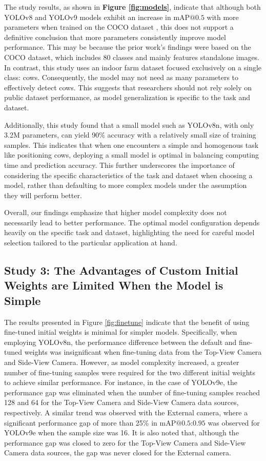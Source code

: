 The study results, as shown in \textbf{Figure \ref{fig:models}}, indicate that although both YOLOv8 \cite{ultralyticsYOLOv8} and YOLOv9 \cite{wang2024yolov9} models exhibit an increase in $\text{mAP@{0.5}}$ with more parameters when trained on the COCO dataset \cite{lin2014microsoft}, this does not support a definitive conclusion that more parameters consistently improve model performance. This may be because the prior work's findings were based on the COCO dataset, which includes 80 classes and mainly features standalone images. In contrast, this study uses an indoor farm dataset focused exclusively on a single class: cows. Consequently, the model may not need as many parameters to effectively detect cows. This suggests that researchers should not rely solely on public dataset performance, as model generalization is specific to the task and dataset.

Additionally, this study found that a small model such as YOLOv8n, with only 3.2M parameters, can yield 90\% accuracy with a relatively small size of training samples. This indicates that when one encounters a simple and homogenous task like positioning cows, deploying a small model is optimal in balancing computing time and prediction accuracy. This further underscores the importance of considering the specific characteristics of the task and dataset when choosing a model, rather than defaulting to more complex models under the assumption they will perform better.

Overall, our findings emphasize that higher model complexity does not necessarily lead to better performance. The optimal model configuration depends heavily on the specific task and dataset, highlighting the need for careful model selection tailored to the particular application at hand.


\subsection{Study 3:  The Advantages of Custom Initial Weights are Limited When the Model is Simple}
The results presented in Figure \ref{fig:finetune} indicate that the benefit of using fine-tuned initial weights is minimal for simpler models. Specifically, when employing YOLOv8n, the performance difference between the default and fine-tuned weights was insignificant when fine-tuning data from the Top-View Camera and Side-View Camera. However, as model complexity increased, a greater number of fine-tuning samples were required for the two different initial weights to achieve similar performance. For instance, in the case of YOLOv9e, the performance gap was eliminated when the number of fine-tuning samples reached 128 and 64 for the Top-View Camera and Side-View Camera data sources, respectively. A similar trend was observed with the External camera, where a significant performance gap of more than 25\% in $\text{mAP@{0.5:0.95}}$ was observed for YOLOv9e when the sample size was 16. It is also noted that, although the performance gap was closed to zero for the Top-View Camera and Side-View Camera data sources, the gap was never closed for the External camera.


